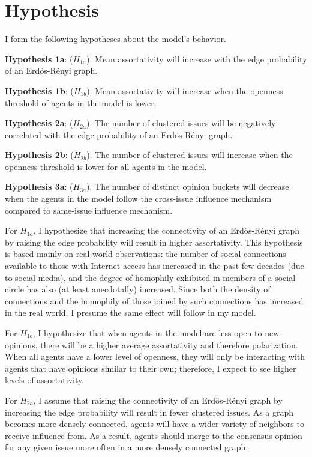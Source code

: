 \section{Hypothesis}
I form the following hypotheses about the model's behavior.

\textbf{Hypothesis 1a}: ($H_{1a}$). Mean assortativity will increase with the
edge probability of an Erd\"{o}s-R\'{e}nyi graph.

\textbf{Hypothesis 1b}: ($H_{1b}$). Mean assortativity will increase when the
openness threshold of agents in the model is lower.

\textbf{Hypothesis 2a}: ($H_{2a}$). The number of clustered issues will be
negatively correlated with the edge probability of an Erd\"{o}s-R\'{e}nyi
graph.

\textbf{Hypothesis 2b}: ($H_{2b}$). The number of clustered issues will
increase when the openness threshold is lower for all agents in the model.

\textbf{Hypothesis 3a}: ($H_{3a}$). The number of distinct opinion buckets will
decrease when the agents in the model follow the cross-issue influence mechanism compared to same-issue influence mechanism.


For $H_{1a}$, I hypothesize that increasing the connectivity of an
Erd\"o{s}-R\'{e}nyi graph by raising the edge probability will result in higher
assortativity. This hypothesis is based mainly on real-world observations: the
number of social connections available to those with Internet access has
increased in the past few decades (due to social media\cite{dean_how_2021}),
and the degree of homophily exhibited in members of a social circle has also
(at least anecdotally) increased. Since both the density of connections and the
homophily of those joined by such connections has increased in the real world,
I presume the same effect will follow in my model.

For $H_{1b}$, I hypothesize that when agents in the model are less open to new
opinions, there will be a higher average assortativity and therefore
polarization. When all agents have a lower level of openness, they will only be
interacting with agents that have opinions similar to their own; therefore, I
expect to see higher levels of assortativity. 

For $H_{2a}$, I assume that raising the connectivity of an Erd\"o{s}-R\'{e}nyi
graph by increasing the edge probability will result in fewer clustered issues.
As a graph becomes more densely connected, agents will have a wider variety of
neighbors to receive influence from. As a result, agents should merge to the
consensus opinion for any given issue more often in a more densely connected
graph. 

